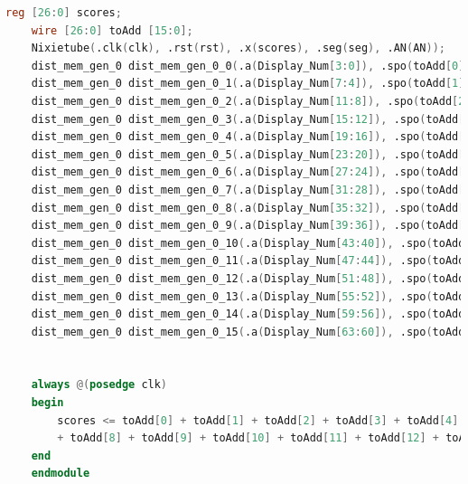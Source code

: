 \documentclass[UTF8]{article}
\begin{document}
\begin{lstlisting}[language=Verilog]
	reg [26:0] scores;
	wire [26:0] toAdd [15:0]; 
	Nixietube(.clk(clk), .rst(rst), .x(scores), .seg(seg), .AN(AN));
	dist_mem_gen_0 dist_mem_gen_0_0(.a(Display_Num[3:0]), .spo(toAdd[0]));
	dist_mem_gen_0 dist_mem_gen_0_1(.a(Display_Num[7:4]), .spo(toAdd[1]));
	dist_mem_gen_0 dist_mem_gen_0_2(.a(Display_Num[11:8]), .spo(toAdd[2]));
	dist_mem_gen_0 dist_mem_gen_0_3(.a(Display_Num[15:12]), .spo(toAdd[3]));
	dist_mem_gen_0 dist_mem_gen_0_4(.a(Display_Num[19:16]), .spo(toAdd[4]));
	dist_mem_gen_0 dist_mem_gen_0_5(.a(Display_Num[23:20]), .spo(toAdd[5]));
	dist_mem_gen_0 dist_mem_gen_0_6(.a(Display_Num[27:24]), .spo(toAdd[6]));
	dist_mem_gen_0 dist_mem_gen_0_7(.a(Display_Num[31:28]), .spo(toAdd[7]));
	dist_mem_gen_0 dist_mem_gen_0_8(.a(Display_Num[35:32]), .spo(toAdd[8]));
	dist_mem_gen_0 dist_mem_gen_0_9(.a(Display_Num[39:36]), .spo(toAdd[9]));
	dist_mem_gen_0 dist_mem_gen_0_10(.a(Display_Num[43:40]), .spo(toAdd[10]));
	dist_mem_gen_0 dist_mem_gen_0_11(.a(Display_Num[47:44]), .spo(toAdd[11]));
	dist_mem_gen_0 dist_mem_gen_0_12(.a(Display_Num[51:48]), .spo(toAdd[12]));
	dist_mem_gen_0 dist_mem_gen_0_13(.a(Display_Num[55:52]), .spo(toAdd[13]));
	dist_mem_gen_0 dist_mem_gen_0_14(.a(Display_Num[59:56]), .spo(toAdd[14]));
	dist_mem_gen_0 dist_mem_gen_0_15(.a(Display_Num[63:60]), .spo(toAdd[15]));
	
	
	always @(posedge clk)
	begin
		scores <= toAdd[0] + toAdd[1] + toAdd[2] + toAdd[3] + toAdd[4] + toAdd[5] + toAdd[6] + toAdd[7]
		+ toAdd[8] + toAdd[9] + toAdd[10] + toAdd[11] + toAdd[12] + toAdd[13] + toAdd[14] + toAdd[15];
	end
	endmodule
	\end{lstlisting}
	
\end{document}
